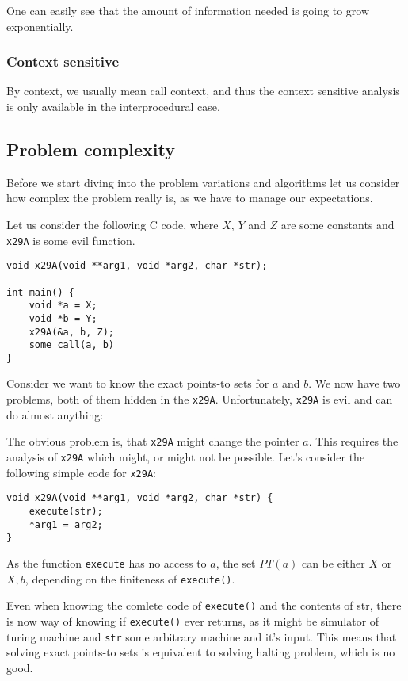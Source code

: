 One can easily see that the amount of information needed is going to grow
exponentially.

\subsubsection{Context sensitive}

By context, we usually mean call context, and thus the context sensitive
analysis is only available in the interprocedural case.



\subsection{Problem complexity}

Before we start diving into the problem variations and algorithms let us
consider how complex the problem really is, as we have to manage our
expectations.

Let us consider the following C code, where $X$, $Y$ and $Z$ are some constants and
{\tt x29A} is some evil function.

\begin{verbatim}
void x29A(void **arg1, void *arg2, char *str);

int main() {
	void *a = X;
	void *b = Y;
	x29A(&a, b, Z);
	some_call(a, b)
}
\end{verbatim}

Consider we want to know the exact points-to sets for $a$ and $b$. We now have
two problems, both of them hidden in the {\tt x29A}. Unfortunately, {\tt x29A}
is evil and can do almost anything:

The obvious problem is, that {\tt x29A} might change the pointer $a$. This
requires the analysis of {\tt x29A} which might, or might not be possible. Let's
consider the following simple code for {\tt x29A}:

\begin{verbatim}
void x29A(void **arg1, void *arg2, char *str) {
	execute(str);
	*arg1 = arg2;
}
\end{verbatim}

As the function {\tt execute} has no access to $a$, the set $PT(a)$ can be
either ${X}$ or ${X, b}$, depending on the finiteness of {\tt execute()}.

Even when knowing the comlete code of {\tt execute()} and the contents of {str},
there is now way of knowing if {\tt execute()} ever returns, as it might be
simulator of turing machine and {\tt str} some arbitrary machine and it's input.
This means that solving exact points-to sets is equivalent  to solving halting
problem, which is no good.

